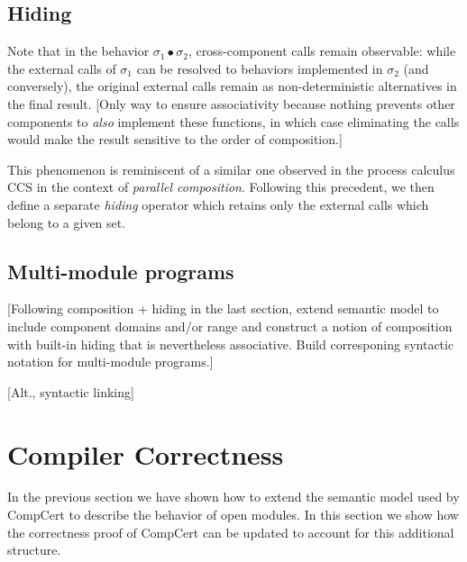 \documentclass[acmsmall,timestamp,review]{acmart}
\begin{document}

\subsection{Hiding} %

Note that
in the behavior $\sigma_1 \bullet \sigma_2$,
cross-component calls remain observable:
while the external calls of $\sigma_1$
can be resolved to behaviors implemented in $\sigma_2$
(and conversely),
the original external calls remain
as non-deterministic alternatives in the final result.
[Only way to ensure associativity
because nothing prevents other components
to \emph{also} implement these functions,
in which case eliminating the calls
would make the result sensitive to the order of composition.]

This phenomenon is reminiscent of a similar one observed
in the process calculus CCS \cite{ccs}
in the context of \emph{parallel composition}.
Following this precedent,
we then define a separate \emph{hiding} operator
which retains only the external calls
which belong to a given set.

\begin{definition}[Hiding]

\end{definition}


\subsection{Multi-module programs} %

[Following composition + hiding in the last section,
extend semantic model to include component domains and/or range
and construct a notion of composition with built-in hiding
that is nevertheless associative.
Build corresponing syntactic notation
for multi-module programs.]

[Alt., syntactic linking]



\section{Compiler Correctness} \label{sec:compcert} %

In the previous section
we have shown how to extend
the semantic model used by CompCert
to describe the behavior of open modules.
In this section
we show how the correctness proof of CompCert
can be updated to account for this additional structure.
\end{document}
